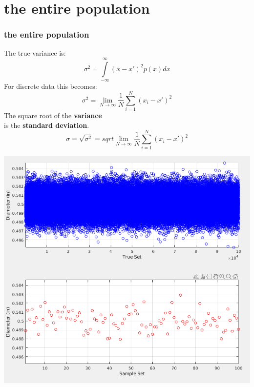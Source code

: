 \documentclass[fleqn]{beamer} %
\newcommand{\sectiontitleII}{the entire population}
\begin{document}
\section{\sectiontitleII}	
	\begin{frame}[label=sectionII] \small
		\frametitle{\sectiontitleII}    
		
		\begin{multicols}{2} \tiny
		The true variance is:\\
		\[ \sigma^2=\int\limits_{-\infty}^{\infty}(x-x')^2p(x)dx \]
		For discrete data this becomes:\\
		\[ \sigma^2=\lim\limits_{N\rightarrow \infty}\frac{1}{N}\sum\limits_{i=1}^{N}(x_i-x')^2 \]
		The square root of the {\bf \BL variance} \\
		is the {\bf \PR standard deviation}. \\
		\[\sigma=\sqrt{\sigma^2}=sqrt{\lim\limits_{N\rightarrow \infty}\frac{1}{N}\sum\limits_{i=1}^{N}(x_i-x')^2}\]

		\hspace*{0cm}\includegraphics[scale=.20]{topic4_fig1.png}		
		
		\end{multicols}
		
	\end{frame}
	
%		
%		
\end{document}
